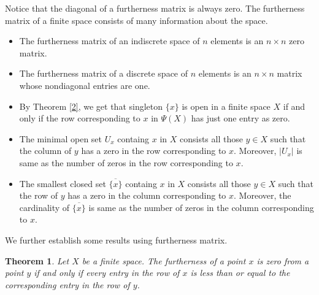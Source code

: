 \documentclass[12pt]{amsart}
\newtheorem{theorem}[definition]{Theorem}
\newtheorem{remark}[definition]{Remark}
\begin{document}
Notice that the diagonal of a furtherness matrix is always zero. The	furtherness matrix of a finite space consists of many information about the space.
\begin{itemize}
\item[1.] The furtherness matrix of an indiscrete space of $n$ elements is an $n\times n$ zero matrix.
\item[2.] The furtherness matrix of a discrete space of $n$ elements is an $n\times n$ matrix whose nondiagonal entries are one.
\item[3.] By Theorem \ref{2}, we get that singleton $\{x\}$ is open in a finite space $X$ if and only if the row corresponding to $x$ in $\Psi(X)$ has just one entry as zero.
\item[4.]  The minimal open set $U_x$ containg $x$ in $X$ consists all those $y\in X$ such that the column of $y$ has a zero in the row corresponding to $x$. Moreover, $|U_x|$ is same as the number of zeros in the row corresponding to $x$.
\item[5.]   The smallest closed set $\overline{\{x\}}$ containg $x$ in $X$ consists all those $y\in X$ such that the row of $y$ has a zero in the column corresponding to $x$. Moreover, the cardinality of $\overline{\{x\}}$ is same as the number of zeros in the column corresponding to $x$.
\end{itemize}





We further establish some results using furtherness matrix.

\begin{theorem}
	Let $X$ be a finite space. The furtherness of a point $x$ is zero from a point $y$ if and only if  every entry in the row of $x$ is less than or equal to the corresponding entry in the row of $y$.
\end{theorem}  
\end{document}
